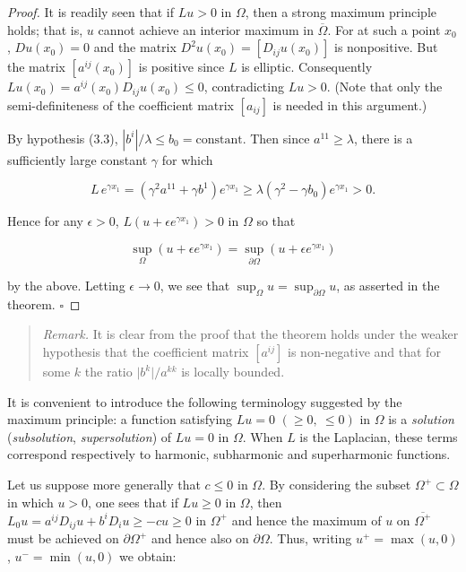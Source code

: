 \begin{proof}
It is readily seen that if $Lu > 0$ in $\Omega$, then a strong maximum principle holds; that is, $u$ cannot achieve an interior maximum in $\overline{\Omega}$. For at such a point $x_0$, $Du(x_0)=0$ and the matrix $D^2u(x_0)=[D_{ij}u(x_0)]$ is nonpositive. But the matrix $[a^{ij}(x_0)]$ is positive since $L$ is elliptic. Consequently $Lu(x_0)=a^{ij}(x_0)D_{ij}u(x_0)\le 0$, contradicting $Lu>0$. (Note that only the semi-definiteness of the coefficient matrix $[a_{ij}]$ is needed in this argument.)

By hypothesis (3.3), $|b^i|/\lambda \le b_0 = \text{constant}$. Then since $a^{11}\ge \lambda$, there is a sufficiently large constant $\gamma$ for which

\[
L\,e^{\gamma x_1} = (\gamma^2 a^{11} + \gamma b^1)e^{\gamma x_1} \ge \lambda(\gamma^2-\gamma b_0)e^{\gamma x_1} > 0.
\]

Hence for any $\epsilon>0$, $L(u+\epsilon e^{\gamma x_1})>0$ in $\Omega$ so that

\[
\sup_{\Omega}(u+\epsilon e^{\gamma x_1}) = \sup_{\partial\Omega}(u+\epsilon e^{\gamma x_1})
\]

by the above. Letting $\epsilon \to 0$, we see that $\sup_{\Omega}u=\sup_{\partial\Omega}u$, as asserted in the theorem. $\square$
\end{proof}


\begin{quote}
\textit{Remark.} It is clear from the proof that the theorem holds under the weaker hypothesis that the coefficient matrix $[a^{ij}]$ is non-negative and that for some $k$ the ratio $\lvert b^k\rvert/a^{kk}$ is locally bounded.
\end{quote}

It is convenient to introduce the following terminology suggested by the maximum principle: a function satisfying $Lu=0$ $(\geq 0,\ \leq 0)$ in $\Omega$ is a \textit{solution} (\textit{subsolution}, \textit{supersolution}) of $Lu=0$ in $\Omega$. When $L$ is the Laplacian, these terms correspond respectively to harmonic, subharmonic and superharmonic functions.

Let us suppose more generally that $c\leq 0$ in $\Omega$. By considering the subset $\Omega^+ \subset \Omega$ in which $u>0$, one sees that if $Lu\geq 0$ in $\Omega$, then $L_0u=a^{ij}D_{ij}u+b^iD_iu\geq -cu\geq 0$ in $\Omega^+$ and hence the maximum of $u$ on $\overline{\Omega^+}$ must be achieved on $\partial\Omega^+$ and hence also on $\partial\Omega$. Thus, writing $u^+=\max(u,0)$, $u^-=\min(u,0)$ we obtain:

